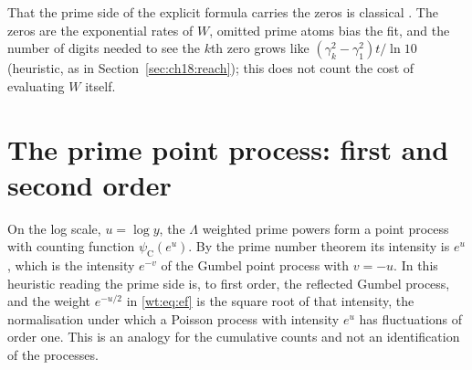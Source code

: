 \begin{table}[h]\centering\small
{}
\caption{Zeros recovered by Prony's method from the heat trace computed from $\Gamma$ and the primes (computed, 110 digits; the source printed errors of $10^{-30}$ for $k\le3$, which was the floor of its reference, and the digits shown are those of the source).}\label{wt:tab:primezeros}
\end{table}

That the prime side of the explicit formula carries the zeros is classical \cite{Guinand48,Weil52}. The zeros are the exponential rates of $W$, omitted prime atoms bias the fit, and the number of digits needed to see the $k$th zero grows like $(\gamma_k^2-\gamma_1^2)t/\ln10$ (heuristic, as in Section~\ref{sec:ch18:reach}); this does not count the cost of evaluating $W$ itself.

\section{The prime point process: first and second order}\label{wt:sec:pp}

On the log scale, $u=\log y$, the $\Lambda$ weighted prime powers form a point process with counting function $\psi_{\mathrm C}(e^u)$. By the prime number theorem its intensity is $e^u$, which is the intensity $e^{-v}$ of the Gumbel point process with $v=-u$. In this heuristic reading the prime side is, to first order, the reflected Gumbel process, and the weight $e^{-u/2}$ in \eqref{wt:eq:ef} is the square root of that intensity, the normalisation under which a Poisson process with intensity $e^u$ has fluctuations of order one. This is an analogy for the cumulative counts and not an identification of the processes.

